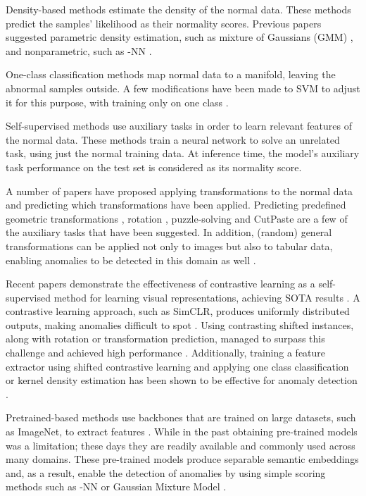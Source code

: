 \documentclass[10pt,twocolumn,letterpaper]{article}
\begin{document}
Density-based methods estimate the density of the normal data. These methods predict the samples' likelihood as their normality scores. Previous papers suggested parametric density estimation, such as mixture of Gaussians (GMM) \cite{glodek2013ensemble}, and nonparametric, such as -NN \cite{peterson2009k}.  

One-class classification methods map normal data to a manifold, leaving the abnormal samples outside. A few modifications have been made to SVM to adjust it for this purpose, with training only on one class \cite{Ruff2018deep, scholkopf1999support, tax2004support}.

Self-supervised methods use auxiliary tasks in order to learn relevant features of the normal data. These methods train a neural network to solve an unrelated task, using just the normal training data. At inference time,  the model's auxiliary task performance on the test set is considered as its normality score.

A number of papers have proposed applying transformations to the normal data and predicting which transformations have been applied. Predicting predefined geometric transformations \cite{golan2018deep}, rotation \cite{hendrycks2019using}, puzzle-solving \cite{salehi2020puzzle} and CutPaste \cite{li2021cutpaste} are a few of the auxiliary tasks that have been suggested. In addition, (random) general transformations can be applied not only to images but also to tabular data, enabling anomalies to be detected in this domain as well \cite{bergman2020classification}. 

Recent papers demonstrate the effectiveness of contrastive learning as a self-supervised method for learning visual representations, achieving SOTA results \cite{chen2020simple,he2020momentum,grill2020bootstrap}. A contrastive learning approach, such as SimCLR, produces uniformly distributed outputs, making anomalies difficult to spot \cite{chen2020simple, sohn2020learning}. Using contrasting shifted instances, along with rotation or transformation prediction, managed to surpass this challenge and achieved high performance \cite{tack2020csi}. Additionally, training a feature extractor using shifted contrastive learning and applying one class classification or kernel density estimation has been shown to be effective for anomaly detection \cite{sohn2020learning}.  

Pretrained-based methods use backbones that are trained on large datasets, such as ImageNet, to extract features \cite{deng2009imagenet}. While in the past obtaining pre-trained models was a limitation; these days they are readily available and commonly used across many domains. These pre-trained models produce separable semantic embeddings and, as a result, enable the detection of anomalies by using simple scoring methods such as -NN or Gaussian Mixture Model \cite{bergman2020deep, xiao2021we}. 
\end{document}
